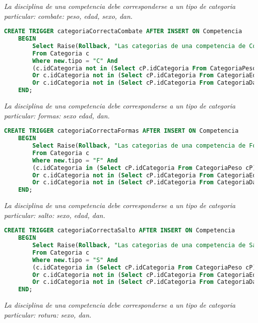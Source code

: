 \emph{
  La disciplina de una competencia debe corresponderse a un tipo de categoria particular: combate: peso, edad, sexo, dan.
}

\begin{lstlisting}[language=SQL]
CREATE TRIGGER categoriaCorrectaCombate AFTER INSERT ON Competencia
    BEGIN
        Select Raise(Rollback, "Las categorias de una competencia de Combate deben ser: Peso, Edad, Genero y Graduacion.")
        From Categoria c
        Where new.tipo = "C" And
        (c.idCategoria not in (Select cP.idCategoria From CategoriaPeso cP)
        Or c.idCategoria not in (Select cP.idCategoria From CategoriaEdad cP)
        Or c.idCategoria not in (Select cP.idCategoria From CategoriaDan cP));
    END;
\end{lstlisting}
  
\emph{
  La disciplina de una competencia debe corresponderse a un tipo de categoria particular: formas: sexo edad, dan.
}

\begin{lstlisting}[language=SQL]
CREATE TRIGGER categoriaCorrectaFormas AFTER INSERT ON Competencia
    BEGIN
        Select Raise(Rollback, "Las categorias de una competencia de Formas deben ser: Edad, Genero y Graduacion.")
        From Categoria c
        Where new.tipo = "F" And
        (c.idCategoria in (Select cP.idCategoria From CategoriaPeso cP)
        Or c.idCategoria not in (Select cP.idCategoria From CategoriaEdad cP)
        Or c.idCategoria not in (Select cP.idCategoria From CategoriaDan cP));
    END;
\end{lstlisting}
\emph{
  La disciplina de una competencia debe corresponderse a un tipo de categoria particular: salto: sexo, edad, dan.
}

\begin{lstlisting}[language=SQL]
CREATE TRIGGER categoriaCorrectaSalto AFTER INSERT ON Competencia
    BEGIN
        Select Raise(Rollback, "Las categorias de una competencia de Salto deben ser: Edad, Genero y Graduacion.")
        From Categoria c
        Where new.tipo = "S" And
        (c.idCategoria in (Select cP.idCategoria From CategoriaPeso cP)
        Or c.idCategoria not in (Select cP.idCategoria From CategoriaEdad cP)
        Or c.idCategoria not in (Select cP.idCategoria From CategoriaDan cP));
    END;

\end{lstlisting}
\emph{
  La disciplina de una competencia debe corresponderse a un tipo de categoria particular: rotura: sexo, dan.
}

